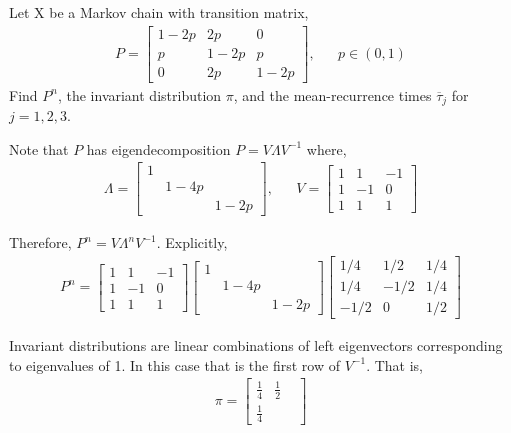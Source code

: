 \begin{problem}[Exercise 4.5]
Let X be a Markov chain with transition matrix,
\begin{align*}
    P = \left[\begin{array}{ccc}1-2p & 2p & 0 \\ p & 1-2p & p \\ 0 & 2p & 1-2p\end{array}\right], && p\in(0,1)
\end{align*}
    Find \( P^n \), the invariant distribution \( \pi \), and the mean-recurrence times \( \overline{\tau}_j \) for \( j=1,2,3 \).
\end{problem}

\begin{solution}[Solution]
    Note that \( P \) has eigendecomposition \( P = V\Lambda V^{-1} \) where,
    \begin{align*}
        \Lambda =
        \left[\begin{array}{rrr}1 \\ &1-4p \\ && 1-2p\end{array}\right]
        ,&&
        V = \left[\begin{array}{rrr} 1 & 1 & -1 \\ 1 & -1 & 0 \\ 1 & 1 & 1\end{array}\right]
    \end{align*}
    
    Therefore, \( P^n = V\Lambda^n V^{-1} \). Explicitly,
    \begin{align*}
        P^n = 
        \left[\begin{array}{rrr} 1 & 1 & -1 \\ 1 & -1 & 0 \\ 1 & 1 & 1\end{array}\right]
        \left[\begin{array}{rrr}1 \\ &1-4p \\ && 1-2p\end{array}\right]
        \left[\begin{array}{rrr}1/4 & 1/2 & 1/4 \\ 1/4 & -1/2 & 1/4 \\ -1/2 & 0 & 1/2\end{array}\right]
    \end{align*}
    
    Invariant distributions are linear combinations of left eigenvectors corresponding to eigenvalues of 1. In this case that is the first row of \( V^{-1} \). That is,
    \begin{align*}
        \pi = \left[\begin{array}{rrr}\frac{1}{4} & \frac{1}{2} & \\ \frac{1}{4}\end{array}\right]
    \end{align*}


\end{solution}
